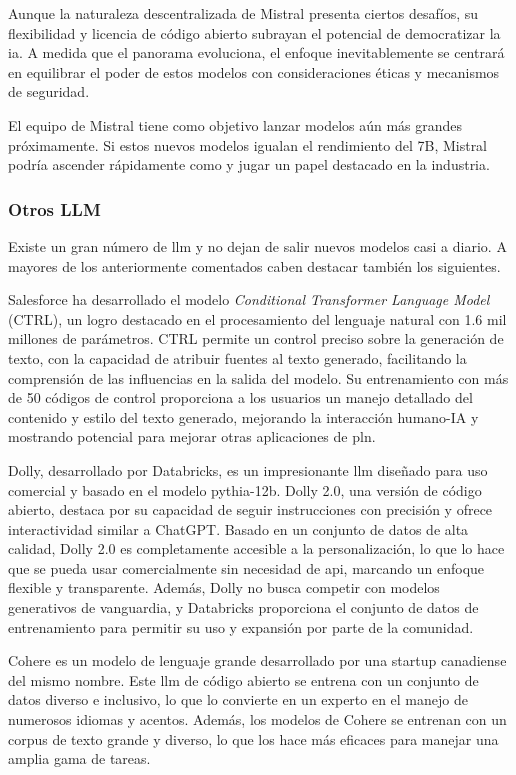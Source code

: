 Aunque la naturaleza descentralizada de Mistral presenta ciertos desafíos, su flexibilidad y licencia de código abierto subrayan el potencial de democratizar la \acrlong{ia}. A medida que el panorama evoluciona, el enfoque inevitablemente se centrará en equilibrar el poder de estos modelos con consideraciones éticas y mecanismos de seguridad.

El equipo de Mistral tiene como objetivo lanzar modelos aún más grandes próximamente. Si estos nuevos modelos igualan el rendimiento del 7B, Mistral podría ascender rápidamente como y jugar un papel destacado en la industria.

\subsubsection{Otros LLM}

Existe un gran número de \acrshort{llm} y no dejan de salir nuevos modelos casi a diario. A mayores de los anteriormente comentados caben destacar también los siguientes.

Salesforce ha desarrollado el modelo \textit{Conditional Transformer Language Model} (CTRL), un logro destacado en el procesamiento del lenguaje natural con 1.6 mil millones de parámetros. CTRL permite un control preciso sobre la generación de texto, con la capacidad de atribuir fuentes al texto generado, facilitando la comprensión de las influencias en la salida del modelo. Su entrenamiento con más de 50 códigos de control proporciona a los usuarios un manejo detallado del contenido y estilo del texto generado, mejorando la interacción humano-IA y mostrando potencial para mejorar otras aplicaciones de \acrlong{pln}.

Dolly, desarrollado por Databricks, es un impresionante \acrfull{llm} diseñado para uso comercial y basado en el modelo pythia-12b. Dolly 2.0, una versión de código abierto, destaca por su capacidad de seguir instrucciones con precisión y ofrece interactividad similar a ChatGPT. Basado en un conjunto de datos de alta calidad, Dolly 2.0 es completamente accesible a la personalización, lo que lo hace que se pueda usar comercialmente sin necesidad de \acrshort{api}, marcando un enfoque flexible y transparente. Además, Dolly no busca competir con modelos generativos de vanguardia, y Databricks proporciona el conjunto de datos de entrenamiento para permitir su uso y expansión por parte de la comunidad.

Cohere es un modelo de lenguaje grande desarrollado por una startup canadiense del mismo nombre. Este \acrshort{llm}  de código abierto se entrena con un conjunto de datos diverso e inclusivo, lo que lo convierte en un experto en el manejo de numerosos idiomas y acentos. Además, los modelos de Cohere se entrenan con un corpus de texto grande y diverso, lo que los hace más eficaces para manejar una amplia gama de tareas.

